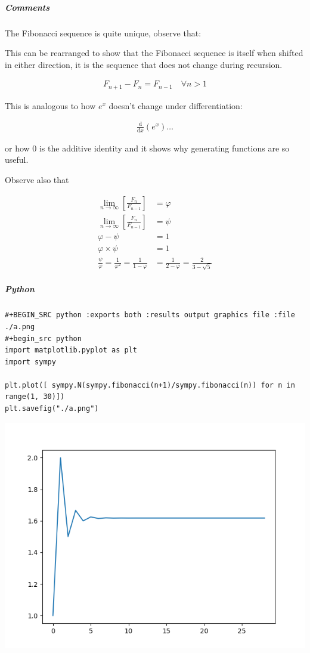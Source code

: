 \documentclass[11pt]{article}
\begin{document}
\subparagraph{Comments}
\label{sec:orgfc5ed7b}

The Fibonacci sequence is quite unique, observe that:

This can be rearranged to show that the Fibonacci sequence is itself
when shifted in either direction, it is the sequence that does not
change during recursion.

\[\begin{aligned}
F_{n+ 1} - F_{n} = F_{n- 1} \quad \forall n > 1
\end{aligned}\]

This is analogous to how \(e^x\) doesn't change under differentiation:

$$\begin{aligned}
\frac{\mathrm{d} }{\mathrm{d} x}\left( e^x \right) \ldots
\end{aligned}$$

or how 0 is the additive identity and it shows why generating functions
are so useful.

Observe also that

$$\begin{aligned}
\lim_{n     \rightarrow \infty }\left[ \frac{F_n}{F_{n- 1} }  \right] &= \varphi \\
\lim_{n     \rightarrow \infty }\left[ \frac{F_n}{F_{n- 1} }  \right] &= \psi \\
\varphi - \psi &=  1 \\
\varphi \times  \psi  &= 1 \\
\frac{\psi}{\varphi}  = \frac{1}{\varphi^2} = \frac{1}{1-\varphi} &= \frac{1}{2-\varphi} = \frac{2}{3 - \sqrt{5}  }
\end{aligned}$$
\subparagraph{Python}
\label{sec:org6334a25}

\lstset{language=:exports,label= ,caption= ,captionpos=b,numbers=none}
\begin{lstlisting}
#+BEGIN_SRC python :exports both :results output graphics file :file ./a.png
#+begin_src python
import matplotlib.pyplot as plt
import sympy

plt.plot([ sympy.N(sympy.fibonacci(n+1)/sympy.fibonacci(n)) for n in range(1, 30)])
plt.savefig("./a.png")
\end{lstlisting}
\begin{center}
\includegraphics[width=.9\linewidth]{./a.png}
\end{center}
\end{document}
